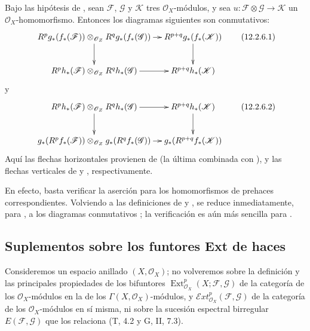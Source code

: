 \begin{env}[12.2.6]
\label{0.12.2.6}
\label{0.12.2.6-fr}
Bajo las hipótesis de , sean $\mathcal F$, $\mathcal G$
y $\mathcal K$ tres $\mathcal O_X$-módulos, y sea
$u:\mathcal F\otimes\mathcal G\to\mathcal K$
un $\mathcal O_X$-homomorfismo.
Entonces los diagramas siguientes son conmutativos:
\[
\xymatrix@C=10pt@R=24pt{
R^p g_*(f_*(\mathcal F))\otimes_{\mathcal O_Z}R^q g_*(f_*(\mathcal G))
\ar[r]\ar[d]&R^{p+q}g_*(f_*(\mathcal K))\ar[d]\\
R^p h_*(\mathcal F)\otimes_{\mathcal O_Z}R^q h_*(\mathcal G)
\ar[r]&R^{p+q}h_*(\mathcal K)
}
\tag{12.2.6.1}\label{0.12.2.6.1-fr}
\]
y
\[
\xymatrix@C=10pt@R=24pt{
R^p h_*(\mathcal F)\otimes_{\mathcal O_Z}R^q h_*(\mathcal G)
\ar[r]\ar[d]&R^{p+q}h_*(\mathcal K)\ar[d]\\
g_*(R^p f_*(\mathcal F))\otimes_{\mathcal O_Z}g_*(R^q f_*(\mathcal G))
\ar[r]&g_*(R^{p+q}f_*(\mathcal K))
}
\tag{12.2.6.2}\label{0.12.2.6.2-fr}
\]
Aquí las flechas horizontales provienen de  (la última
combinada con ), y las flechas
verticales de  y , respectivamente.

En efecto, basta verificar la aserción para los homomorfismos de prehaces
correspondientes.  Volviendo a las definiciones de
 y , se reduce inmediatamente, para
, a los diagramas conmutativos
; la verificación es aún más sencilla para
.
\end{env}

\subsection{Suplementos sobre los funtores Ext de haces}
\label{subsection:0.12.3}
\label{subsection:0.12.3-fr}

\begin{env}[12.3.1]
\label{0.12.3.1-fr}
Consideremos un espacio anillado $(X,\mathcal O_X)$; no volveremos sobre la definición y las principales propiedades de los bifuntores $\operatorname{Ext}_{\mathcal O_X}^p(X;\mathcal F,\mathcal G)$ de la categoría de los $\mathcal O_X$-módulos en la de los $\Gamma(X,\mathcal O_X)$-módulos, y $\mathcal{E}xt_{\mathcal O_X}^p(\mathcal F,\mathcal G)$ de la categoría de los $\mathcal O_X$-módulos en sí misma, ni sobre la sucesión espectral birregular $E(\mathcal F,\mathcal G)$ que los relaciona (T, 4.2 y G, II, 7.3).
\end{env}


